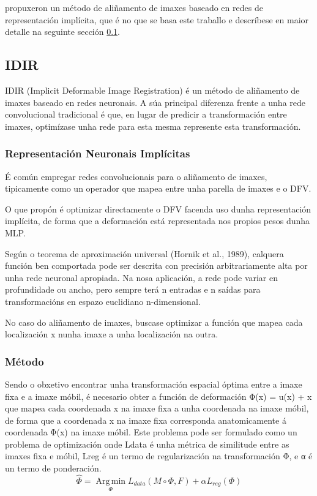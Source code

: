 \cite{wolterink2021implicit} propuxeron un método de aliñamento de imaxes baseado en redes de representación implícita,
 que é no que se basa este traballo e descríbese en maior detalle na seguinte sección \ref{subsec:IDIR}.

\subsection{IDIR}
\label{subsec:IDIR}
IDIR (Implicit Deformable Image Registration) é un método de aliñamento de imaxes baseado en redes neuronais. 
A súa principal diferenza frente a unha rede convolucional tradicional é que, 
en lugar de predicir a transformación entre imaxes, optimízase unha rede para esta mesma represente esta transformación.


\subsubsection{Representación Neuronais Implícitas}
\label{subsubsec:Representación Neuronais Implícitas}

É común empregar redes convolucionais para o aliñamento de imaxes,
 tipicamente como un operador que mapea entre unha parella de imaxes e o DFV.

O que \cite{wolterink2021implicit} propón é optimizar directamente o DFV facenda uso
 dunha representación implícita, de forma que a deformación está representada nos propios pesos dunha MLP.

Según o teorema de aproximación universal (Hornik et al., 1989), calquera función ben comportada
 pode ser descrita con precisión arbitrariamente alta por unha rede neuronal apropiada. 
 Na nosa aplicación, a rede pode variar en profundidade ou ancho, pero sempre terá n entradas e n saídas para transformacións en espazo euclidiano n-dimensional.




No caso do aliñamento de imaxes, buscase optimizar a función que mapea cada localización x nunha imaxe a unha localización na outra.


 \subsubsection{Método}
 \label{subsubsec:Método}

Sendo o obxetivo encontrar unha transformación espacial óptima entre a imaxe fixa e a imaxe móbil,
 é necesario obter a función de deformación  Φ(x) = u(x) + x que mapea cada coordenada x na imaxe fixa a unha coordenada na imaxe móbil, 
 de forma que a coordenada x na imaxe fixa corresponda anatomicamente á coordenada Φ(x) na imaxe móbil.
Este problema pode ser formulado como un problema de optimización onde Ldata é unha métrica de similitude entre as imaxes fixa e móbil, Lreg é un termo de regularización na transformación Φ, e α é un termo de ponderación.
\begin{equation}
    \hat{\Phi} = \operatorname*{Arg\,min}_{\Phi} L_{data}(M \circ \Phi, F) + \alpha L_{reg}(\Phi)
\end{equation}

